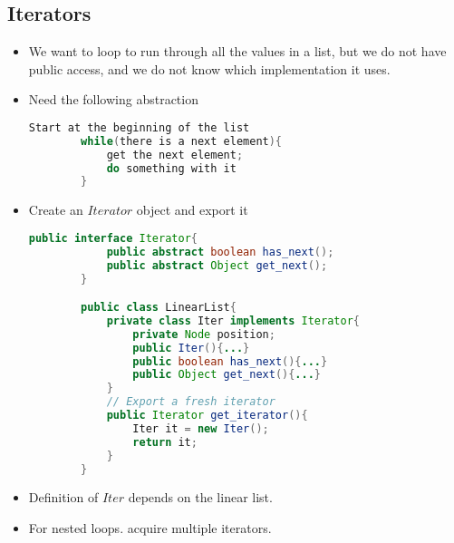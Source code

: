 \documentclass[a4paper]{article}
\begin{document}
\subsection{Iterators}
\begin{itemize}
    \item We want to loop to run through all the values in a list, but we do not have public access, and we do not know which implementation it uses.
    \item Need the following abstraction
    \begin{lstlisting}[language=Java]
        Start at the beginning of the list
        while(there is a next element){
            get the next element;
            do something with it
        }
    \end{lstlisting}
    \item Create an $Iterator$ object and export it
    \begin{lstlisting}[language=Java]
        public interface Iterator{
            public abstract boolean has_next();
            public abstract Object get_next();
        }

        public class LinearList{
            private class Iter implements Iterator{
                private Node position;
                public Iter(){...}
                public boolean has_next(){...}
                public Object get_next(){...}
            }
            // Export a fresh iterator
            public Iterator get_iterator(){
                Iter it = new Iter();
                return it;
            }
        }
    \end{lstlisting}
    \item Definition of $Iter$ depends on the linear list.
    \item For nested loops. acquire multiple iterators.
\end{itemize}
\end{document}
